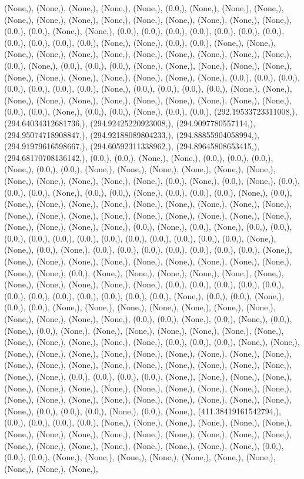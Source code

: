 \documentclass{article}
\begin{document}
(None,), (None,), (None,), (None,), (None,), (0.0,), (None,), (None,), (None,), (None,), (None,), (None,), (None,), (None,), (None,), (None,), (None,), (None,), (0.0,), (0.0,), (None,), (None,), (0.0,), (0.0,), (0.0,), (0.0,), (0.0,), (0.0,), (0.0,), (0.0,), (0.0,), (0.0,), (0.0,), (None,), (None,), (0.0,), (0.0,), (None,), (None,), (None,), (None,), (None,), (None,), (None,), (None,), (None,), (None,), (None,), (0.0,), (None,), (0.0,), (0.0,), (0.0,), (None,), (None,), (None,), (None,), (None,), (None,), (None,), (None,), (None,), (None,), (None,), (None,), (0.0,), (0.0,), (0.0,), (0.0,), (0.0,), (0.0,), (0.0,), (None,), (0.0,), (0.0,), (0.0,), (0.0,), (None,), (None,), (None,), (None,), (None,), (None,), (None,), (None,), (None,), (None,), (None,), (0.0,), (0.0,), (None,), (0.0,), (0.0,), (None,), (0.0,), (0.0,), (292.19533723311008,), (294.64034312681736,), (294.92425220923008,), (294.9097780557114,), (294.95074718908847,), (294.92188089804233,), (294.88855904058994,), (294.91979616598667,), (294.60592311338962,), (294.89645808653415,), (294.68170708136142,), (0.0,), (0.0,), (None,), (None,), (0.0,), (0.0,), (0.0,), (None,), (0.0,), (0.0,), (None,), (None,), (None,), (None,), (None,), (None,), (None,), (None,), (None,), (None,), (None,), (0.0,), (None,), (0.0,), (None,), (0.0,), (0.0,), (0.0,), (None,), (0.0,), (0.0,), (None,), (0.0,), (0.0,), (0.0,), (None,), (0.0,), (None,), (None,), (None,), (None,), (None,), (None,), (None,), (None,), (None,), (None,), (None,), (None,), (None,), (None,), (None,), (None,), (None,), (None,), (None,), (None,), (None,), (None,), (0.0,), (None,), (0.0,), (None,), (0.0,), (0.0,), (0.0,), (0.0,), (0.0,), (0.0,), (0.0,), (0.0,), (0.0,), (0.0,), (0.0,), (0.0,), (None,), (None,), (0.0,), (None,), (0.0,), (0.0,), (0.0,), (0.0,), (0.0,), (0.0,), (0.0,), (None,), (None,), (None,), (None,), (None,), (None,), (None,), (None,), (None,), (None,), (None,), (None,), (0.0,), (None,), (None,), (None,), (None,), (None,), (None,), (None,), (None,), (None,), (None,), (None,), (0.0,), (0.0,), (0.0,), (0.0,), (0.0,), (0.0,), (0.0,), (0.0,), (0.0,), (0.0,), (0.0,), (0.0,), (None,), (0.0,), (0.0,), (None,), (0.0,), (0.0,), (None,), (None,), (None,), (None,), (None,), (None,), (None,), (None,), (None,), (None,), (None,), (0.0,), (0.0,), (None,), (0.0,), (None,), (0.0,), (None,), (0.0,), (None,), (None,), (None,), (None,), (None,), (None,), (None,), (None,), (None,), (None,), (None,), (None,), (0.0,), (0.0,), (0.0,), (None,), (None,), (None,), (None,), (None,), (None,), (None,), (None,), (None,), (None,), (None,), (None,), (None,), (None,), (None,), (None,), (None,), (None,), (None,), (None,), (None,), (None,), (0.0,), (0.0,), (0.0,), (0.0,), (None,), (None,), (None,), (None,), (None,), (None,), (None,), (None,), (None,), (None,), (None,), (None,), (None,), (None,), (None,), (None,), (None,), (None,), (None,), (None,), (None,), (None,), (None,), (0.0,), (0.0,), (0.0,), (None,), (0.0,), (None,), (411.38419161542794,), (0.0,), (0.0,), (0.0,), (0.0,), (None,), (None,), (None,), (None,), (None,), (None,), (None,), (None,), (None,), (None,), (None,), (None,), (None,), (None,), (None,), (None,), (None,), (None,), (None,), (None,), (None,), (None,), (None,), (0.0,), (0.0,), (0.0,), (None,), (None,), (None,), (None,), (None,), (None,), (None,), (None,), (None,), (None,), 
\end{document}
